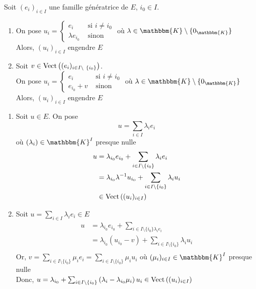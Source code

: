 \begin{prop}
	Soit $(e_i)_{i\in I}$ une famille génératrice de $E$, $i_0 \in I$.
	\begin{enumerate}
		\item On pose $u_i = \begin{cases}
				e_i &\text{ si } i \neq i_0\\
				\lambda e_{i_0} &\text{ sinon}
			\end{cases}$ où $\lambda \in \mathbbm{K}\setminus \{0_\mathbbm{K}\}$ \\
			Alors, $(u_i)_{i\in I}$ engendre $E$
		\item Soit $v \in \Vect\left( (e_i)_{i\in I \setminus \{i_0\}} \right)$.\\
			On pose $u_i = \begin{cases}
				e_i &\text{ si } i \neq i_0\\
				e_{i_0} + v &\text{ sinon}
			\end{cases}$ où $\lambda \in \mathbbm{K}\setminus \{0_\mathbbm{K}\}$ \\
			Alors, $(u_i)_{i\in I}$ engendre $E$
	\end{enumerate}
\end{prop}

\begin{prv}
	\begin{enumerate}
		\item Soit $u \in  E$. On pose \[
				u = \sum_{i \in I} \lambda_i e_i
			\] où $(\lambda_i) \in \mathbbm{K}^I$ presque nulle\\
			\begin{align*}
				u &= \lambda_{i_0}e_{i_0} + \sum_{i \in I\setminus \{i_0\}} \lambda_i e_i\\
				&= \lambda_{i_0}\lambda^{-1}u_{i_0} + \sum_{i \in I \setminus \{i_0\} }\lambda_iu_i \\
				&\in \operatorname{Vect}\left( (u_i)_{i\in I} \right) 
			\end{align*}
		\item Soit $u = \sum_{i \in I} \lambda_ie_i \in E$ \\
			\begin{align*}
				u &= \lambda_{i_0}e_{i_0} + \sum_{i \in I\setminus \{i_0\} \lambda_ie_i} \\
				&= \lambda_{i_0}\left( u_{i_0}-v \right) + \sum_{i \in I\setminus \{i_0\}} \lambda_i u_i \\
			\end{align*}
			Or, $v = \sum_{i \in I \setminus \{i_0\}} \mu_i e_i = \sum_{i \in I\setminus \{i_0\}} \mu_i u_i$ où $(\mu_i)_{i\in I} \in \mathbbm{K}^I$ presque nulle\\
			Donc, $u = \lambda_{i_0}+ \sum_{i \in I \setminus \{i_0\} } \left( \lambda_i - \lambda_{i_0}\mu_i \right) u_i \in \operatorname{Vect}\left( (u_i)_{i\in I} \right)$
	\end{enumerate}
\end{prv}

